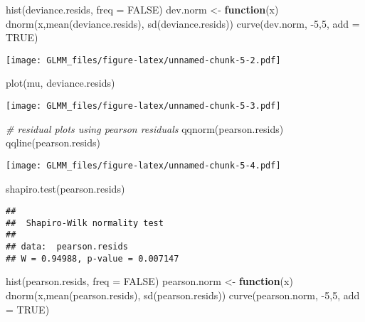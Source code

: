 \documentclass[
]{book}
\newenvironment{Shaded}{\begin{snugshade}}{\end{snugshade}}
\newcommand{\AttributeTok}[1]{\textcolor[rgb]{0.77,0.63,0.00}{#1}}
\newcommand{\CommentTok}[1]{\textcolor[rgb]{0.56,0.35,0.01}{\textit{#1}}}
\newcommand{\ConstantTok}[1]{\textcolor[rgb]{0.00,0.00,0.00}{#1}}
\newcommand{\ControlFlowTok}[1]{\textcolor[rgb]{0.13,0.29,0.53}{\textbf{#1}}}
\newcommand{\DecValTok}[1]{\textcolor[rgb]{0.00,0.00,0.81}{#1}}
\newcommand{\FunctionTok}[1]{\textcolor[rgb]{0.00,0.00,0.00}{#1}}
\newcommand{\NormalTok}[1]{#1}
\newcommand{\OtherTok}[1]{\textcolor[rgb]{0.56,0.35,0.01}{#1}}
\newcommand{\SpecialCharTok}[1]{\textcolor[rgb]{0.00,0.00,0.00}{#1}}
\begin{document}
\begin{Shaded}
\begin{Highlighting}[]
\FunctionTok{hist}\NormalTok{(deviance.resids, }\AttributeTok{freq =} \ConstantTok{FALSE}\NormalTok{)}
\NormalTok{dev.norm }\OtherTok{\textless{}{-}} \ControlFlowTok{function}\NormalTok{(x) }\FunctionTok{dnorm}\NormalTok{(x,}\FunctionTok{mean}\NormalTok{(deviance.resids), }\FunctionTok{sd}\NormalTok{(deviance.resids))}
\FunctionTok{curve}\NormalTok{(dev.norm, }\SpecialCharTok{{-}}\DecValTok{5}\NormalTok{,}\DecValTok{5}\NormalTok{, }\AttributeTok{add =} \ConstantTok{TRUE}\NormalTok{)}
\end{Highlighting}
\end{Shaded}

\texttt{[image: GLMM\_files/figure-latex/unnamed-chunk-5-2.pdf]}

\begin{Shaded}
\begin{Highlighting}[]
\FunctionTok{plot}\NormalTok{(mu, deviance.resids)}
\end{Highlighting}
\end{Shaded}

\texttt{[image: GLMM\_files/figure-latex/unnamed-chunk-5-3.pdf]}

\begin{Shaded}
\begin{Highlighting}[]
\CommentTok{\# residual plots using pearson residuals}
\FunctionTok{qqnorm}\NormalTok{(pearson.resids)}
\FunctionTok{qqline}\NormalTok{(pearson.resids)}
\end{Highlighting}
\end{Shaded}

\texttt{[image: GLMM\_files/figure-latex/unnamed-chunk-5-4.pdf]}

\begin{Shaded}
\begin{Highlighting}[]
\FunctionTok{shapiro.test}\NormalTok{(pearson.resids)}
\end{Highlighting}
\end{Shaded}

\begin{verbatim}
## 
##  Shapiro-Wilk normality test
## 
## data:  pearson.resids
## W = 0.94988, p-value = 0.007147
\end{verbatim}

\begin{Shaded}
\begin{Highlighting}[]
\FunctionTok{hist}\NormalTok{(pearson.resids, }\AttributeTok{freq =} \ConstantTok{FALSE}\NormalTok{)}
\NormalTok{pearson.norm }\OtherTok{\textless{}{-}} \ControlFlowTok{function}\NormalTok{(x) }\FunctionTok{dnorm}\NormalTok{(x,}\FunctionTok{mean}\NormalTok{(pearson.resids), }\FunctionTok{sd}\NormalTok{(pearson.resids))}
\FunctionTok{curve}\NormalTok{(pearson.norm, }\SpecialCharTok{{-}}\DecValTok{5}\NormalTok{,}\DecValTok{5}\NormalTok{, }\AttributeTok{add =} \ConstantTok{TRUE}\NormalTok{)}
\end{Highlighting}
\end{Shaded}
\end{document}
